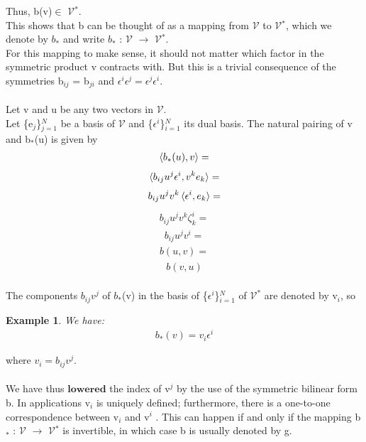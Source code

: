 \documentclass[12pt,a4paper]{article}
\newtheorem{exmp}{Example}[section]
\begin{document}
Thus, b(v)$\in$ $\mathcal{V}$$^*$. \\This shows that b can be thought of as a mapping from
$\mathcal{V}$ to $\mathcal{V}$$^*$, which we denote by $b_*$ and write $b_*$ : $\mathcal{V}$ $\to$ $\mathcal{V}$$^*$. 
\\For this mapping
to make sense, it should not matter which factor in the symmetric product v
contracts with. But this is a trivial consequence of the symmetries b$_{ij}$ = b$_{ji}$
and $\epsilon^i \epsilon^j = \epsilon^j \epsilon^i.$\\
\\Let v and u be any two vectors in $\mathcal{V}$. \\Let  \{e$_j$\}$^N_{j=1}$ be a basis of $\mathcal{V}$ and \{$\epsilon^i$\}$^N_{i=1}$ its dual basis. The natural pairing of v and b$_*$(u) is given by
\begin{align*}
\braket{b_*(u), v} = 
\end{align*}
\begin{align*}
\braket{b_{ij} u^j \epsilon^i, v^k e_k} =
\end{align*}
\begin{align*}
b_{ij}u^j v^k \braket{\epsilon^i, e_k}=
\end{align*}
\begin{align*}
b_{ij}u^j v^k \zeta^i_k=
\end{align*}
\begin{align*}
b_{ij}u^j v^i=
\end{align*}
\begin{align*}
b(u,v)=
\end{align*}
\begin{align*}
b(v,u)
\end{align*}
\\
The components $b_{ij}v^{j}$ of $b_*$(v) in the basis of \{$\epsilon^i$\}$^N_{i=1}$ of $\mathcal{V}^*$ are denoted by v$_i$, so
\begin{exmp} \label{eq1}
We have:
\begin{align*}
b_*(v) = v_i \epsilon^i
\end{align*}
\end{exmp}
where $v_i = b_{ij} v^j$.\\
\\
We have thus $\textbf{lowered}$ the index of v$^j$ by the use of the symmetric bilinear
form b. In applications v$_i$ is uniquely defined; furthermore, there is a one-to-one correspondence between v$_i$ and v$^i$
. This can happen if and only if the
mapping b$_*$ : $\mathcal{V}$ $\to$ $\mathcal{V}$$^*$ is invertible, in which case b is usually denoted by g.\\
\end{document}
